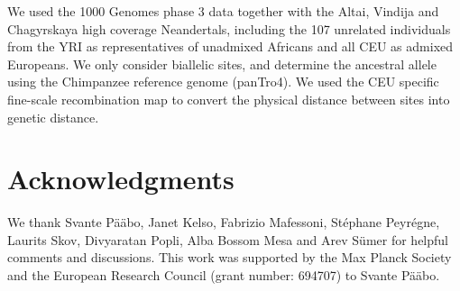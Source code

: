 \documentclass[]{article}
\begin{document}
We used the 1000 Genomes phase 3 data together with the Altai, Vindija and Chagyrskaya high coverage Neandertals, including the 107 unrelated individuals from the YRI as representatives of unadmixed Africans and all CEU as admixed Europeans. We only consider biallelic sites, and determine the ancestral allele using  the Chimpanzee reference genome (panTro4). We used the CEU specific fine-scale recombination map \citep{spence_inference_2019} to convert the physical distance between sites into genetic distance. 

\section{Acknowledgments}

We thank Svante P\"a\"abo, Janet Kelso, Fabrizio Mafessoni, St\'{e}phane Peyr\'{e}gne, Laurits Skov, Divyaratan Popli, Alba Bossom Mesa and Arev S\"umer for helpful comments and discussions.
This work was supported by the Max Planck Society and the European Research Council (grant number: 694707) to Svante P\"a\"abo.



\hypertarget{refs}{}




\end{document}
